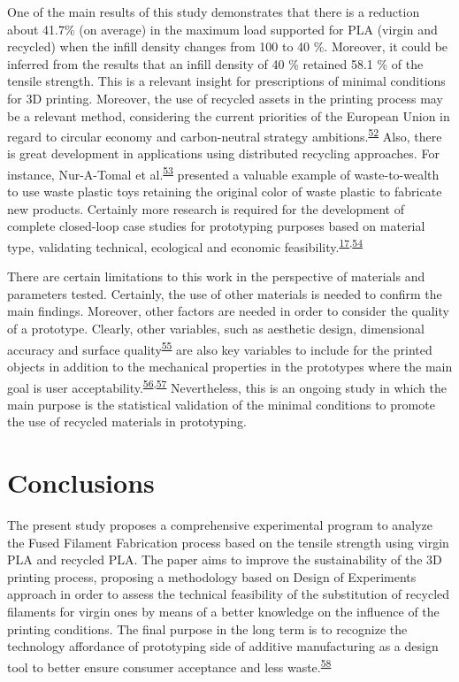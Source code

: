 \documentclass[
  12pt]{article}
\begin{document}
One of the main results of this study demonstrates that there is a reduction about 41.7\% (on average) in the maximum load supported for PLA (virgin and recycled) when the infill density changes from 100 to 40 \%.
Moreover, it could be inferred from the results that an infill density of 40 \% retained 58.1 \% of the tensile strength.
This is a relevant insight for prescriptions of minimal conditions for 3D printing. Moreover, the use of recycled assets in the printing process may be a relevant method, considering the current priorities of the European Union in regard to circular economy and carbon-neutral strategy ambitions.\textsuperscript{\protect\hyperlink{ref-Schwarz2021}{52}}
Also, there is great development in applications using distributed recycling approaches.
For instance, Nur-A-Tomal et al.\textsuperscript{\protect\hyperlink{ref-Nur-A-Tomal2020}{53}} presented a valuable example of waste-to-wealth to use waste plastic toys retaining the original color of waste plastic to fabricate new products. Certainly more research is required for the development of complete closed-loop case studies for prototyping purposes based on material type, validating technical, ecological and economic feasibility.\textsuperscript{\protect\hyperlink{ref-CruzSanchez2020}{17},\protect\hyperlink{ref-Sauerwein2019}{54}}

There are certain limitations to this work in the perspective of materials and parameters tested.
Certainly, the use of other materials is needed to confirm the main findings.
Moreover, other factors are needed in order to consider the quality of a prototype. Clearly, other variables, such as aesthetic design, dimensional accuracy and surface quality\textsuperscript{\protect\hyperlink{ref-Jin2017}{55}} are also key variables to include for the printed objects in addition to the mechanical properties in the prototypes where the main goal is user acceptability.\textsuperscript{\protect\hyperlink{ref-Sauer2009}{56},\protect\hyperlink{ref-Sauer2010}{57}}
Nevertheless, this is an ongoing study in which the main purpose is the statistical validation of the minimal conditions to promote the use of recycled materials in prototyping.

\hypertarget{section:conclusions}{%
\section{Conclusions}\label{section:conclusions}}

The present study proposes a comprehensive experimental program to analyze the Fused Filament Fabrication process based on the tensile strength using virgin PLA and recycled PLA. The paper aims to improve the sustainability of the 3D printing process, proposing a methodology based on Design of Experiments approach in order to assess the technical feasibility of the substitution of recycled filaments for virgin ones by means of a better knowledge on the influence of the printing conditions. The final purpose in the long term is to recognize the technology affordance of prototyping side of additive manufacturing as a design tool to better ensure consumer acceptance and less waste.\textsuperscript{\protect\hyperlink{ref-Kohtala2015a}{58}}
\end{document}
